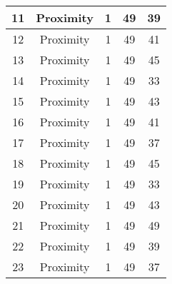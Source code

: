 \documentclass[results.tex]{subfiles}
\begin{document}
\begin{center}
\begin{tabular}{| c || c | c | c | c |}
            \hline
            11                      & Proximity                    & 1                      & 49                      & 39                   \\
            \hline
            12                      & Proximity                    & 1                      & 49                      & 41                   \\
            \hline
            13                      & Proximity                    & 1                      & 49                      & 45                   \\
            \hline
            14                      & Proximity                    & 1                      & 49                      & 33                   \\
            \hline
            15                      & Proximity                    & 1                      & 49                      & 43                   \\
            \hline
            16                      & Proximity                    & 1                      & 49                      & 41                   \\
            \hline
            17                      & Proximity                    & 1                      & 49                      & 37                   \\
            \hline
            18                      & Proximity                    & 1                      & 49                      & 45                   \\
            \hline
            19                      & Proximity                    & 1                      & 49                      & 33                   \\
            \hline
            20                      & Proximity                    & 1                      & 49                      & 43                   \\
            \hline
            21                      & Proximity                    & 1                      & 49                      & 49                   \\
            \hline
            22                      & Proximity                    & 1                      & 49                      & 39                   \\
            \hline
            23                      & Proximity                    & 1                      & 49                      & 37                   \\

\end{tabular}
\end{center}
\end{document}
